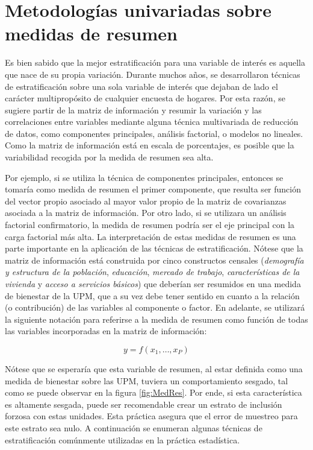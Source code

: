 \documentclass[
  12pt,
]{book}
\begin{document}
\hypertarget{metodologuxedas-univariadas-sobre-medidas-de-resumen}{%
\section{Metodologías univariadas sobre medidas de resumen}\label{metodologuxedas-univariadas-sobre-medidas-de-resumen}}

Es bien sabido que la mejor estratificación para una variable de interés es aquella que nace de su propia variación. Durante muchos años, se desarrollaron técnicas de estratificación sobre una sola variable de interés que dejaban de lado el carácter multipropósito de cualquier encuesta de hogares. Por esta razón, se sugiere partir de la matriz de información y resumir la variación y las correlaciones entre variables mediante alguna técnica multivariada de reducción de datos, como componentes principales, análisis factorial, o modelos no lineales. Como la matriz de información está en escala de porcentajes, es posible que la variabilidad recogida por la medida de resumen sea alta.

Por ejemplo, si se utiliza la técnica de componentes principales, entonces se tomaría como medida de resumen el primer componente, que resulta ser función del vector propio asociado al mayor valor propio de la matriz de covarianzas asociada a la matriz de información. Por otro lado, si se utilizara un análisis factorial confirmatorio, la medida de resumen podría ser el eje principal con la carga factorial más alta. La interpretación de estas medidas de resumen es una parte importante en la aplicación de las técnicas de estratificación. Nótese que la matriz de información está construida por cinco constructos censales (\emph{demografía y estructura de la población}, \emph{educación}, \emph{mercado de trabajo}, \emph{características de la vivienda} y \emph{acceso a servicios básicos}) que deberían ser resumidos en una medida de bienestar de la UPM, que a su vez debe tener sentido en cuanto a la relación (o contribución) de las variables al componente o factor. En adelante, se utilizará la siguiente notación para referirse a la medida de resumen como función de todas las variables incorporadas en la matriz de información:

\[
y = f(x_1,\ldots, x_P)
\]

Nótese que se esperaría que esta variable de resumen, al estar definida como una medida de bienestar sobre las UPM, tuviera un comportamiento sesgado, tal como se puede observar en la figura \ref{fig:MedRes}. Por ende, si esta característica es altamente sesgada, puede ser recomendable crear un estrato de inclusión forzosa con estas unidades. Esta práctica asegura que el error de muestreo para este estrato sea nulo. A continuación se enumeran algunas técnicas de estratificación comúnmente utilizadas en la práctica estadística.
\end{document}

